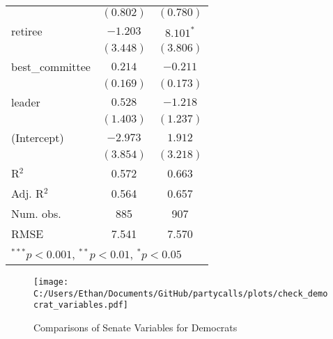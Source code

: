 \documentclass[12pt]{article}
\begin{document}
\begin{table}
\begin{center}
\begin{tabular}{l c c }
			& $(0.802)$      & $(0.780)$      \\
			retiree                  & $-1.203$       & $8.101^{*}$    \\
			& $(3.448)$      & $(3.806)$      \\
			best\_committee          & $0.214$        & $-0.211$       \\
			& $(0.169)$      & $(0.173)$      \\
			leader                   & $0.528$        & $-1.218$       \\
			& $(1.403)$      & $(1.237)$      \\
			(Intercept)              & $-2.973$       & $1.912$        \\
			& $(3.854)$      & $(3.218)$      \\
			\hline
			R$^2$                    & 0.572          & 0.663          \\
			Adj. R$^2$               & 0.564          & 0.657          \\
			Num. obs.                & 885            & 907            \\
			RMSE                     & 7.541          & 7.570          \\
			\hline
			\multicolumn{3}{l}{\scriptsize{$^{***}p<0.001$, $^{**}p<0.01$, $^*p<0.05$}}
		\end{tabular}
	\end{center}
\end{table}

\begin{figure}[h]
	\caption{Comparisons of Senate Variables for Democrats}
	\centering
	\texttt{[image: C:/Users/Ethan/Documents/GitHub/partycalls/plots/check\_democrat\_variables.pdf]}
	
\end{figure}
\end{document}
